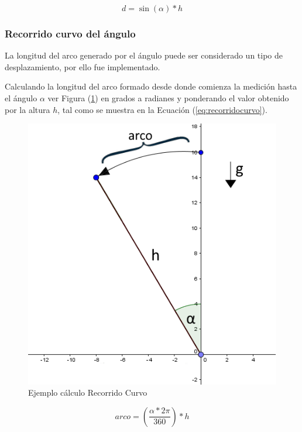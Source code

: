 \documentclass[12pt,a4paper]{article}
\begin{document}
\begin{equation}
	\label{eq:proyeccion}
	d=\sin(\alpha)*h
\end{equation}


\subsubsection{Recorrido curvo del ángulo}
La longitud del arco generado por el ángulo puede ser considerado un tipo de desplazamiento, por ello fue implementado.

Calculando la longitud del arco formado desde donde comienza la medición hasta el ángulo $\alpha$ ver Figura (\ref{fig:recorridocurvo}) en grados a radianes y ponderando el valor obtenido por la altura $h$, tal como se muestra en la Ecuación (\ref{eq:recorridocurvo}).

\begin{figure}[H]
	\centering
	\includegraphics[scale=0.7]{images/calculoRecorridoCurvo}
	\caption{Ejemplo cálculo Recorrido Curvo}
	\label{fig:recorridocurvo}
\end{figure}

\begin{equation}
	\label{eq:recorridocurvo}
	arco=\left(\frac{\alpha*2\pi}{360}\right)*h
\end{equation}

\newpage
\end{document}

